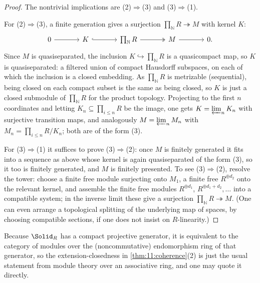 \begin{proof}
The nontrivial implications are (2)$\Rightarrow$(3) and (3)$\Rightarrow$(1).

For (2)$\Rightarrow$(3), a finite generation gives a surjection
$\prod_{\mathbb{N}}R\twoheadrightarrow M$ with kernel $K$:
\[
\begin{tikzcd}[column sep=large]
0 \arrow[r] & K \arrow[r, hook] & \prod_{\mathbb{N}}R \arrow[r, two heads] & M
\arrow[r] & 0.
\end{tikzcd}
\]
Since $M$ is quasiseparated, the inclusion $K\hookrightarrow\prod_{\mathbb{N}}R$
is a quasicompact map, so $K$ is quasiseparated: a filtered union of compact
Hausdorff subspaces, on each of which the inclusion is a closed embedding. As
$\prod_{\mathbb{N}}R$ is metrizable (sequential), being closed on each compact
subset is the same as being closed, so $K$ is just a closed submodule of
$\prod_{\mathbb{N}}R$ for the product topology. Projecting to the first $n$
coordinates and letting $K_{n}\subseteq\prod_{i\le n}R$ be the image, one gets
$K=\varprojlim_{n}K_{n}$ with surjective transition maps, and analogously
$M=\varprojlim_{n}M_{n}$ with $M_{n}=\prod_{i\le n}R/K_{n}$; both are of the
form (3).

For (3)$\Rightarrow$(1) it suffices to prove (3)$\Rightarrow$(2): once $M$ is
finitely generated it fits into a sequence as above whose kernel is again
quasiseparated of the form (3), so it too is finitely generated, and $M$ is
finitely presented. To see (3)$\Rightarrow$(2), resolve the tower: choose a
finite free module surjecting onto $M_{1}$, a finite free $R^{\oplus d_{2}}$
onto the relevant kernel, and assemble the finite free modules $R^{\oplus
d_{1}}$, $R^{\oplus d_{1}+d_{2}},\dots$ into a compatible system; in the inverse
limit these give a surjection $\prod_{\mathbb{N}}R\twoheadrightarrow M$. (One
can even arrange a topological splitting of the underlying map of spaces, by
choosing compatible sections, if one does not insist on $R$-linearity.)
\end{proof}

\begin{remark}
\label{rmk:11:endomorphism}
Because $\Solid_{R}$ has a compact projective generator, it is equivalent to
the category of modules over the (noncommutative) endomorphism ring of that
generator, so the extension-closedness in \cref{thm:11:coherence}(2) is just
the usual statement from module theory over an associative ring, and one may
quote it directly.
\end{remark}

